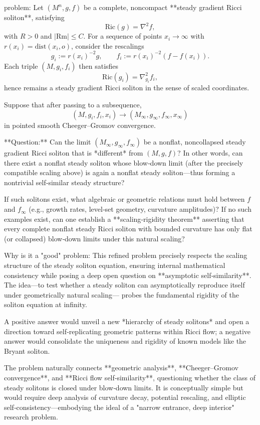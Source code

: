 problem:  
Let \((M^n, g, f)\) be a complete, noncompact **steady gradient Ricci soliton**, satisfying  
\[
\mathrm{Ric}(g) = \nabla^2 f,
\]
with \(R>0\) and \(|\mathrm{Rm}|\le C\).  
For a sequence of points \(x_i\to\infty\) with \(r(x_i)=\mathrm{dist}(x_i,o)\), consider the rescalings  
\[
g_i := r(x_i)^{-2} g, \qquad f_i := r(x_i)^{-2} (f - f(x_i)).
\]
Each triple \((M,g_i,f_i)\) then satisfies
\[
\mathrm{Ric}(g_i) = \nabla^2_{g_i} f_i,
\]
hence remains a steady gradient Ricci soliton in the sense of scaled coordinates.

Suppose that after passing to a subsequence,  
\[
(M, g_i, f_i, x_i) \to (M_\infty, g_\infty, f_\infty, x_\infty)
\]
in pointed smooth Cheeger–Gromov convergence.

**Question:**  
Can the limit \((M_\infty, g_\infty, f_\infty)\) be a nonflat, noncollapsed steady gradient Ricci soliton that is *different* from \((M,g,f)\)?  
In other words, can there exist a nonflat steady soliton whose blow‑down limit (after the precisely compatible scaling above) is again a nonflat steady soliton—thus forming a nontrivial self‑similar steady structure?  

If such solitons exist, what algebraic or geometric relations must hold between \(f\) and \(f_\infty\) (e.g., growth rates, level‑set geometry, curvature amplitudes)?  
If no such examples exist, can one establish a **scaling‑rigidity theorem** asserting that every complete nonflat steady Ricci soliton with bounded curvature has only flat (or collapsed) blow‑down limits under this natural scaling?

Why is it a "good" problem:  
This refined problem precisely respects the scaling structure of the steady soliton equation, ensuring internal mathematical consistency while posing a deep open question on **asymptotic self‑similarity**. The idea—to test whether a steady soliton can asymptotically reproduce itself under geometrically natural scaling— probes the fundamental rigidity of the soliton equation at infinity.  

A positive answer would unveil a new *hierarchy of steady solitons* and open a direction toward self‑replicating geometric patterns within Ricci flow; a negative answer would consolidate the uniqueness and rigidity of known models like the Bryant soliton.  

The problem naturally connects **geometric analysis**, **Cheeger–Gromov convergence**, and **Ricci flow self‑similarity**, questioning whether the class of steady solitons is closed under blow‑down limits. It is conceptually simple but would require deep analysis of curvature decay, potential rescaling, and elliptic self‑consistency—embodying the ideal of a "narrow entrance, deep interior" research problem.